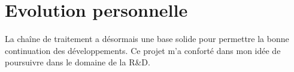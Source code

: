 \section{Evolution personnelle}

La chaîne de traitement a désormais une base solide pour permettre la bonne continuation des développements. Ce projet m’a conforté dans mon idée de poursuivre dans le domaine de la R\&D. \citep{neapolitan_learning_2007}
